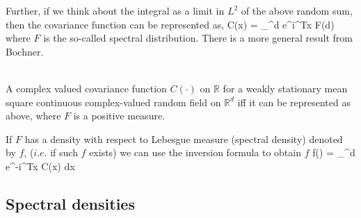 Further, if we think about the integral as a limit in $L^2$ of the above random sum, then the covariance function can be represented as,
\beq C(x) = \int_{^d} e^{i\omega^Tx} F(d\omega)\eeq
where $F$ is the so-called spectral distribution. There is a more general result from Bochner.

\begin{thm}\hfill \\
	
	A complex valued covariance function $C(\cdot)$ on $\mathbb{R}$ for a weakly stationary mean square continuous complex-valued random field on $\mathbb{R}^d$ iff it can be represented as above, where $F$ is a positive measure.
\end{thm}

If $F$ has a density with respect to Lebesgue measure (spectral density) denoted by $f$, ($i.e.$ if such $f$ exists) we can use the inversion formula to obtain $f$
\beq 
f(\omega) =   \int_{^d} e^{-i\omega^Tx} C(x) dx 
\eeq

\subsection{Spectral densities}

